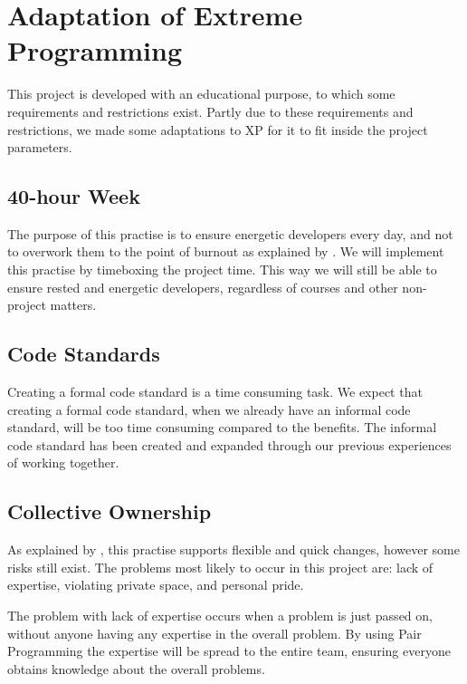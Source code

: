 \section{Adaptation of Extreme Programming}\label{sec:adaptations}
This project is developed with an educational purpose, to which some requirements and restrictions exist.
Partly due to these requirements and restrictions, we made some adaptations to XP for it to fit inside the project parameters.

\subsection{40-hour Week}
The purpose of this practise is to ensure energetic developers every day, and not to overwork them to the point of burnout as explained by \citet[p. 58]{xp:explored}.
We will implement this practise by timeboxing the project time.
This way we will still be able to ensure rested and energetic developers, regardless of courses and other non-project matters.


\subsection{Code Standards}
Creating a formal code standard is a time consuming task.
We expect that creating a formal code standard, when we already have an informal code standard, will be too time consuming compared to the benefits.
The informal code standard has been created and expanded through our previous experiences of working together.

\subsection{Collective Ownership}
As explained by \citet[p. 54]{xp:explored}, this practise supports flexible and quick changes, however some risks still exist.
The problems most likely to occur in this project are: lack of expertise, violating private space, and personal pride.

The problem with lack of expertise occurs when a problem is just passed on, without anyone having any expertise in the overall problem.
By using Pair Programming the expertise will be spread to the entire team, ensuring everyone obtains knowledge about the overall problems.

